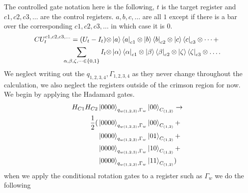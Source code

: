 The controlled gate notation here is the following, $t$ is the target register and $c1,c2,c3,\dots$ are the control registers. $a,b,c,\dots$ are all $1$ except if there is a bar over the corresponding $c1,c2,c3,\dots$ in which case it is $0$. 
\begin{equation}
    \begin{split}
        CU^{c1,c2,c3,\dots}_t = (U_t-I_t)\otimes &\ket{a}\bra{a}_{c1} \otimes \ket{b}\bra{b}_{c2} \otimes \ket{c}\bra{c}_{c3}\otimes\dots+\\ 
        \sum_{\alpha,\beta,\zeta,\dots\in\{0,1\}}I_t\otimes &\ket{\alpha}\bra{\alpha}_{c1} \otimes \ket{\beta}\bra{\beta}_{c2} \otimes \ket{\zeta}\bra{\zeta}_{c3}\otimes\dots. 
    \end{split}
\end{equation}
We neglect writing out the $q_{1,2,3,4},\Gamma_{1,2,3,4}$ as they never change throughout the calculation, we also neglect the registers outside of the crimson region for now. 
We begin by applying the Hadamard gates.
\begin{equation}
    \begin{split}
        H_{C1}H_{C2}&\ket{0000}_{q_{w(1,2,3)},\Gamma_w}\ket{ 00}_{C_{(1,2)}}\to\\
        \frac{1}{2}(
        &\ket{0000}_{q_{w(1,2,3)},\Gamma_w}\ket{ 00}_{C_{(1,2)}}+\\
        &\ket{0000}_{q_{w(1,2,3)},\Gamma_w}\ket{ 01}_{C_{(1,2)}}+\\
        &\ket{0000}_{q_{w(1,2,3)},\Gamma_w}\ket{ 10}_{C_{(1,2)}}+\\
        &\ket{0000}_{q_{w(1,2,3)},\Gamma_w}\ket{ 11}_{C_{(1,2)}}
        )
    \end{split}
\end{equation}
when we apply the conditional rotation gates to a register such as $\Gamma_w$ we do the following
